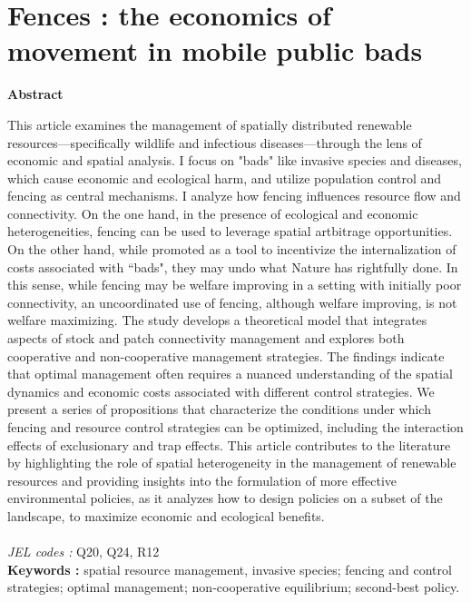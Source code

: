 \chapter{Fences : the economics of movement in mobile public bads}


\begin{center}

\textbf{Abstract}\par
    \vspace*{.2cm}
    \noindent
    \begin{minipage}{0.9\textwidth}
This article examines the management of spatially distributed renewable resources—specifically wildlife and infectious diseases—through the lens of economic and spatial analysis. I focus on "bads" like invasive species and diseases, which cause economic and ecological harm, and utilize population control and fencing as central  mechanisms. I analyze how fencing influences resource flow and connectivity. On the one hand, in the presence of ecological and economic heterogeneities, fencing can be used to leverage spatial artbitrage opportunities. On the other hand, while promoted as a tool to incentivize the internalization of costs associated with ``bads", they may undo what Nature has rightfully done. In this sense, while fencing may be welfare improving in a setting with initially poor connectivity, an uncoordinated use of fencing, although welfare improving, is not welfare maximizing. The study develops a theoretical model that integrates aspects of stock and patch connectivity management and explores both cooperative and non-cooperative management strategies. The findings indicate that optimal management often requires a nuanced understanding of the spatial dynamics and economic costs associated with different control strategies. We present a series of propositions that characterize the conditions under which fencing and resource control strategies can be optimized, including the interaction effects of exclusionary and trap effects. This article contributes to the literature by highlighting the role of spatial heterogeneity in the management of renewable resources and providing insights into the formulation of more effective environmental policies, as it analyzes how to design policies on a subset of the landscape, to maximize economic and ecological benefits. \\\\
\textit{JEL codes :} Q20, Q24, R12\\
\textbf{Keywords :} spatial resource management, invasive species; fencing and control strategies; optimal management; non-cooperative equilibrium; second-best policy. 
\end{minipage}
\end{center}
    \vfill


